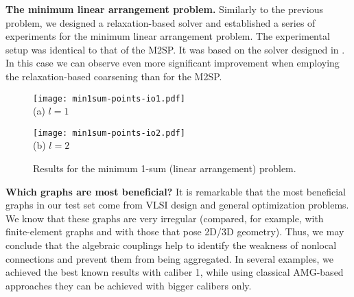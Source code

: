 \documentclass[final]{siamltex}
\begin{document}
\par {\bf The minimum linear arrangement problem.} Similarly to the previous problem, we designed a relaxation-based solver and established a series of experiments for the minimum linear arrangement problem. The experimental setup was identical to that of the M2SP. It was based on the solver designed in \cite{safro2003}. In this case we can observe even more significant improvement when employing the relaxation-based coarsening than for the M2SP.
\begin{figure}[h]
\begin{minipage}[b]{0.5\linewidth} \centering
\texttt{[image: min1sum-points-io1.pdf]}\\
(a) $l=1$
\end{minipage}
\hspace{0.5cm} \begin{minipage}[b]{0.5\linewidth}
\centering
\texttt{[image: min1sum-points-io2.pdf]}\\
(b) $l=2$
\end{minipage}
\caption{Results for the minimum 1-sum (linear arrangement) problem.}\label{fig:1sum}
\end{figure}
\par {\bf Which graphs are most beneficial?} It is remarkable that the most beneficial graphs in our test set come from VLSI design and general optimization problems. We know that these graphs are very irregular (compared, for example,   with finite-element graphs and with those that pose 2D/3D geometry). Thus, we may conclude that the algebraic couplings help to identify the weakness of nonlocal connections and prevent them from being aggregated. In several examples, we achieved the best known results with caliber 1, while using classical AMG-based approaches they can be achieved with bigger calibers only.
\end{document}
